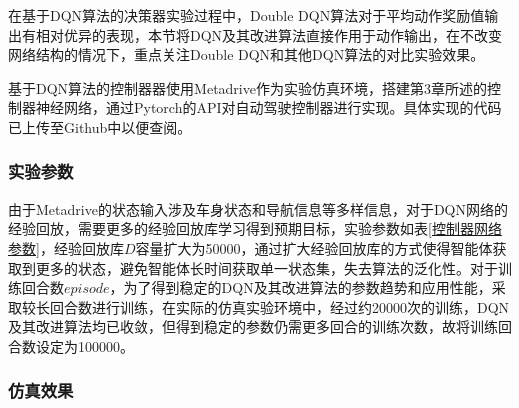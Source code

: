 在基于DQN算法的决策器实验过程中，Double DQN算法对于平均动作奖励值输出有相对优异的表现，本节将DQN及其改进算法直接作用于动作输出，在不改变网络结构的情况下，重点关注Double DQN和其他DQN算法的对比实验效果。

基于DQN算法的控制器器使用Metadrive作为实验仿真环境，搭建第3章所述的控制器神经网络，通过Pytorch的API对自动驾驶控制器进行实现。具体实现的代码已上传至Github中以便查阅\cite{metadrive-dqn}。

\subsubsection{实验参数}

\begin{table}[htbp]
    \caption{控制器网络参数}\label{控制器网络参数}
    \centering
    \renewcommand\arraystretch{1.5}
\end{table}

由于Metadrive的状态输入涉及车身状态和导航信息等多样信息，对于DQN网络的经验回放，需要更多的经验回放库学习得到预期目标，实验参数如表\ref{控制器网络参数}，经验回放库$D$容量扩大为50000，通过扩大经验回放库的方式使得智能体获取到更多的状态，避免智能体长时间获取单一状态集，失去算法的泛化性。对于训练回合数$episode$，为了得到稳定的DQN及其改进算法的参数趋势和应用性能，采取较长回合数进行训练，在实际的仿真实验环境中，经过约20000次的训练，DQN及其改进算法均已收敛，但得到稳定的参数仍需更多回合的训练次数，故将训练回合数设定为100000。

\subsubsection{仿真效果}





